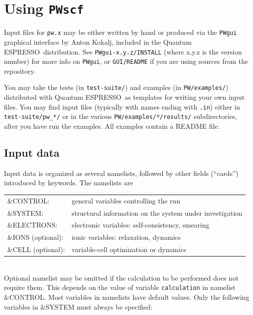 \documentclass[12pt,a4paper]{article}
\def\PWscf{\texttt{PWscf}}
\def\qe{{\sc Quantum ESPRESSO}}
\begin{document}
\newpage\section{Using \PWscf}

Input files for \texttt{pw.x} may be either written by hand 
or produced via the \texttt{PWgui} graphical interface by Anton Kokalj, 
included in the \qe\ distribution. See \texttt{PWgui-x.y.z/INSTALL}
(where x.y.z is the version number) for more info on \texttt{PWgui}, 
or \texttt{GUI/README} if you are using sources from the repository.
    
You may take the tests (in \texttt{test-suite/}) and examples
(in \texttt{PW/examples/}) distributed with \qe\ as templates for
writing your own input files. You may find input files (typically
with names ending with \texttt{.in}) either in \texttt{test-suite/pw\_*/}
or in the various \texttt{PW/examples/*/results/} subdirectories,
after you have run the examples. All examples contain a README file.

\subsection{Input data}

Input data 
is organized as several namelists, followed by other fields (``cards'')
introduced by keywords. The namelists are

\begin{tabular}{ll}
      \&CONTROL:& general variables controlling the run\\
      \&SYSTEM: &structural information on the system under investigation\\
      \&ELECTRONS: &electronic variables: self-consistency, smearing\\
      \&IONS (optional): &ionic variables: relaxation, dynamics\\
      \&CELL (optional): &variable-cell optimization or dynamics\\
\end{tabular}    \\
Optional namelist may be omitted if the calculation to be performed
does not require them. This depends on the value of variable 
\texttt{calculation}
in namelist \&CONTROL. Most variables in namelists have default values. Only
the following variables in \&SYSTEM must always be specified:
\end{document}

